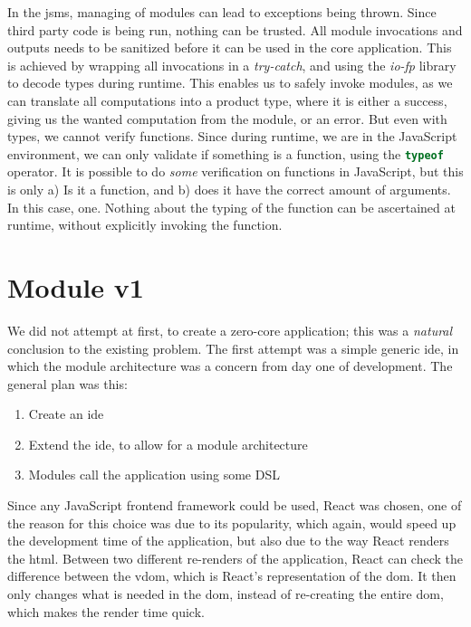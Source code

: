 In the \gls*{jsms}, managing of modules can lead to exceptions being thrown.
Since third party code is being run, nothing can be trusted. All module
invocations and outputs needs to be sanitized before it can be used in the core
application. This is achieved by wrapping all invocations in a
\textit{try-catch}, and using the \textit{io-fp} library to decode types during
runtime. This enables us to safely invoke modules, as we can translate all
computations into a product type, where it is either a success, giving us the
wanted computation from the module, or an error. But even with types, we cannot
verify functions. Since during runtime, we are in the JavaScript environment,
we can only validate if something is a function, using the
\lstinline[language=JavaScript]{typeof} operator. It is possible to do
\textit{some} verification on functions in JavaScript, but this is only a) Is it
a function, and b) does it have the correct amount of arguments. In this case,
one. Nothing about the typing of the function can be ascertained at runtime,
without explicitly invoking the function.

\section{Module v1} \label{sec:mod1}

We did not attempt at first, to create a zero-core application; this was a
\textit{natural} conclusion to the existing problem. The first attempt was a
simple generic \gls*{ide}, in which the module architecture was a concern from
day one of development. The general plan was this:

\begin{enumerate}
  \item Create an \gls*{ide}
  \item Extend the \gls*{ide}, to allow for a module architecture
  \item Modules call the application using some DSL
\end{enumerate}

Since any JavaScript frontend framework could be used, React was chosen, one of
the reason for this choice was due to its popularity, which again, would speed
up the development time of the application, but also due to the way React
renders the \gls*{html}. Between two different re-renders of the application,
React can check the difference between the \gls*{vdom}, which is React's
representation of the \gls*{dom}. It then only changes what is needed in the
\gls*{dom}, instead of re-creating the entire \gls*{dom}, which makes the render
time quick.

